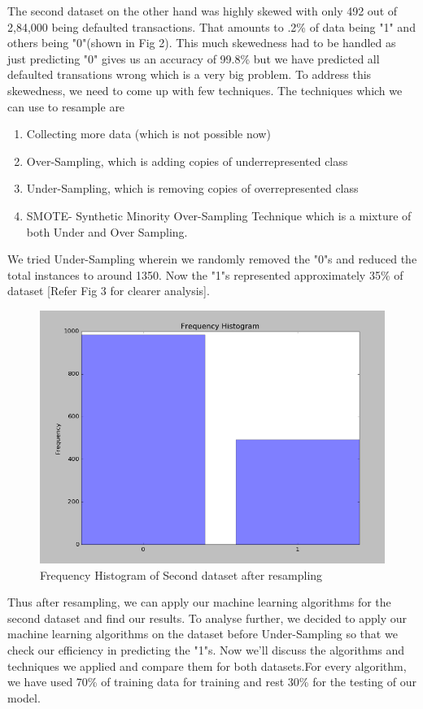	The second dataset on the other hand was highly skewed with only 492 out of 2,84,000 being defaulted transactions. That amounts to .2\% of data being "1" and others being "0"(shown in Fig 2). This much skewedness had to be handled as just predicting "0" gives us an accuracy of 99.8\% but we have predicted all defaulted transations wrong which is a very big problem. To address this skewedness, we need to come up with few techniques. The techniques which we can use to resample are
\begin{enumerate}
	\item Collecting more data (which is not possible now)
	\item Over-Sampling, which is adding copies of underrepresented class
	\item Under-Sampling, which is removing copies of overrepresented class
	\item SMOTE- Synthetic Minority Over-Sampling Technique which is a mixture of both Under and Over Sampling.
\end{enumerate}
	\par We tried Under-Sampling wherein we randomly removed the "0"s and reduced the total instances to around 1350. Now the "1"s represented approximately 35\% of dataset [Refer Fig 3 for clearer analysis].
\begin{figure}
  \centering
  \includegraphics[scale=.4]{freq2fin.png}
  \caption{Frequency Histogram of Second dataset after resampling}
  
\end{figure}

   Thus after resampling, we can apply our machine learning algorithms for the second dataset and find our results. To analyse further, we decided to apply our machine learning algorithms on the dataset before Under-Sampling so that we check our efficiency in predicting the "1"s. Now we'll discuss the algorithms and techniques we applied and compare them for both datasets.For every algorithm, we have used 70\% of training data for training and rest 30\% for the testing of our model.

